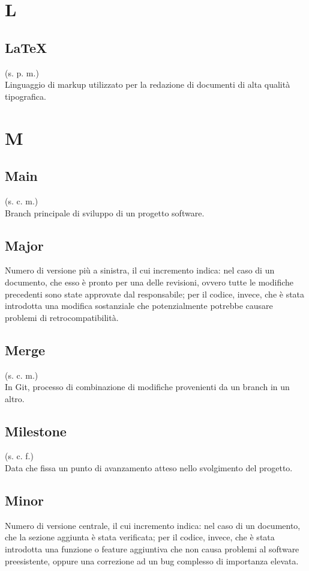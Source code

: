 \section{L}
    \subsection{LaTeX}
    \label{LaTeX}
    (s. p. m.)\\
    Linguaggio di markup utilizzato per la redazione di documenti di alta qualità tipografica.
\pagebreak
\section{M}
    \subsection{Main}
    (s. c. m.)\\
    Branch principale di sviluppo di un progetto software.
    \subsection{Major}
    Numero di versione più a sinistra, il cui incremento indica: nel caso di un documento, che esso è pronto per una delle revisioni, ovvero tutte le modifiche precedenti sono state 
    approvate dal responsabile; per il codice, invece, che è stata introdotta una modifica sostanziale che potenzialmente potrebbe causare problemi di retrocompatibilità.
    \subsection{Merge}
    (s. c. m.)\\
    In Git, processo di combinazione di modifiche provenienti da un branch in un altro.
    \subsection{Milestone}
    (s. c. f.)\\
    Data che fissa un punto di avanzamento atteso nello svolgimento del progetto.
    \subsection{Minor}
    Numero di versione centrale, il cui incremento indica: nel caso di un documento, che la sezione aggiunta è stata verificata; per il codice, invece, che è stata
    introdotta una funzione o feature aggiuntiva che non causa problemi al software preesistente, oppure una correzione ad un bug complesso di importanza elevata.
\pagebreak
